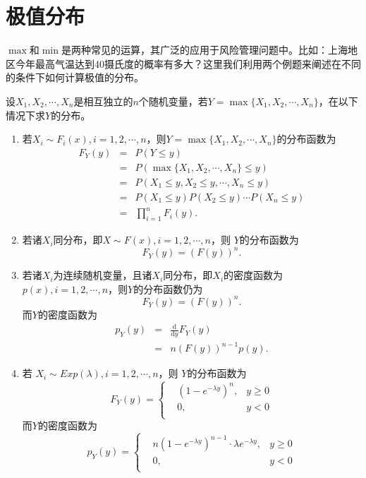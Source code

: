 \section{极值分布}
$\max$和$\min$是两种常见的运算，其广泛的应用于风险管理问题中。比如：上海地区今年最高气温达到40摄氏度的概率有多大？这里我们利用两个例题来阐述在不同的条件下如何计算极值的分布。

\begin{example}
    设$X_1,X_2,\cdots,X_n$是相互独立的$n$个随机变量，若$Y=\max\{X_1,X_2,\cdots,X_n\}$，在以下情况下求$Y$的分布。
    \begin{enumerate}
        \item 若$X_i \sim F_i(x),i=1,2,\cdots,n$，则$Y=\max\{X_1,X_2,\cdots,X_n\}$的分布函数为
        \begin{eqnarray*}
            F_Y(y) &=& P(Y\leq y)\\
            &=& P(\max\{X_1,X_2,\cdots,X_n\}\leq y)\\
            &=& P(X_1\leq y,X_2\leq y,\cdots,X_n \leq y)\\
            &=& P(X_1\leq y) P(X_2\leq y) \cdots P(X_n \leq y)\\
            &=& \prod_{i=1}^n F_{i}(y).
        \end{eqnarray*}
        \item 若诸$X_i$同分布，即$X \sim F(x), i=1,2,\cdots,n$，则
        $Y$的分布函数为
        $$
        F_Y(y) = \left(F(y)\right)^n.
        $$
        \item 若诸$X_i$为连续随机变量，且诸$X_i$同分布，即$X_i$的密度函数为$p(x),i=1,2,\cdots,n$，则$Y$的分布函数仍为
        $$
        F_Y(y) = \left(F(y)\right)^n.
        $$
        而$Y$的密度函数为
        \begin{eqnarray*}
            p_Y(y) &=& \frac{\text{d}}{\text{d}y}F_Y(y) \\
            &=& n \left(F(y)\right)^{n-1} p(y).
        \end{eqnarray*}
        \item 若 $X_i \sim Exp(\lambda),i=1,2,\cdots,n$，则
        $Y$的分布函数为
        $$
        F_Y(y) = \left\{
        \begin{aligned}
            & (1-e^{-\lambda y})^n, & y\geq 0\\
            & 0, & y < 0\\
        \end{aligned}
        \right.
        $$
        而$Y$的密度函数为
          $$
        p_Y(y) = \left\{
        \begin{aligned}
            & n(1-e^{-\lambda y})^{n-1}\cdot \lambda e^{-\lambda y} , & y\geq 0\\
            & 0, & y < 0\\
        \end{aligned}
        \right.
        $$
    \end{enumerate}
\end{example}
